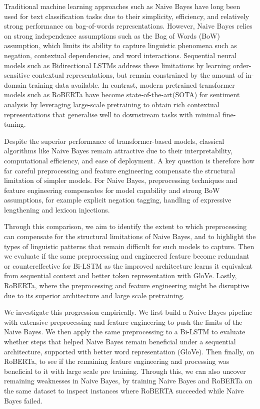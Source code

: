 \documentclass[11pt]{article}
\begin{document}
Traditional machine learning approaches such as Naive Bayes have long been used for text classification tasks due to their simplicity, efficiency, and relatively strong performance on bag-of-words representations. However, Naive Bayes relies on strong independence assumptions such as the Bag of Words (BoW) assumption, which limits its ability to capture linguistic phenomena such as negation, contextual dependencies, and word interactions. 
Sequential neural models such as Bidirectional LSTMs address these limitations by learning order-sensitive contextual representations, but remain constrained by the amount of in-domain training data available.
In contrast, modern pretrained transformer models such as RoBERTa have become state-of-the-art(SOTA) for sentiment analysis by leveraging large-scale pretraining to obtain rich contextual representations that generalise well to downstream tasks with minimal fine-tuning.

Despite the superior performance of transformer-based models, classical algorithms like Naive Bayes remain attractive due to their interpretability, computational efficiency, and ease of deployment. 
A key question is therefore how far careful preprocessing and feature engineering compensate the structural limitation of simpler models.
For Naive Bayes, preprocessing techniques and feature engineering compensates for model capability and strong BoW assumptions, for example explicit negation tagging, handling of expressive lengthening and lexicon injections.

Through this comparison, we aim to identify the extent to which preprocessing can compensate for the structural limitations of Naive Bayes, and to highlight the types of linguistic patterns that remain difficult for such models to capture. 
Then we evaluate if the same preprocessing and engineered feature become redundant or countereffective for Bi-LSTM as the improved architecture learns it equivalent from sequential context and better token representation with GloVe. 
Lastly, RoBERTa, where the preprocessing and feature engineering might be disruptive due to its superior architecture and large scale pretraining.

We investigate this progression empirically. We first build a Naive Bayes pipeline with extensive preprocessing and feature engineering to push the limits of the Naive Bayes. We then apply the same preprocessing to a Bi-LSTM to evaluate whether steps that helped 
Naive Bayes remain beneficial under a sequential architecture, supported with better word representation (GloVe). Then finally, on RoBERTa, to see if the remaining feature engineering and processing was beneficial to it with large scale pre training. Through this, we can also uncover remaining weaknesses in Naive Bayes, by 
training Naive Bayes and RoBERTa on the same dataset to inspect instances where RoBERTA succeeded while Naive Bayes failed.
\end{document}
